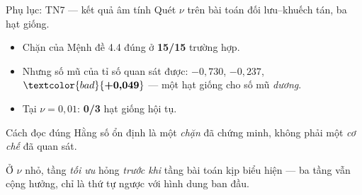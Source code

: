 \documentclass[aspectratio=169,11pt]{beamer}
\newcommand{\good}[1]{\textcolor{good}{\textbf{#1}}}
\newcommand{\bad}[1]{\textcolor{bad}{\textbf{#1}}}
\begin{document}
\begin{frame}{Phụ lục: TN7 --- kết quả âm tính}
Quét $\nu$ trên bài toán đối lưu--khuếch tán, ba hạt giống.

\begin{itemize}
\item Chặn của Mệnh đề 4.4 đúng ở \good{15/15} trường hợp.
\item Nhưng số mũ của tỉ số quan sát được: $-0{,}730$, $-0{,}237$, $\bad{+0{,}049}$
  --- một hạt giống cho số mũ \emph{dương}.
\item Tại $\nu = 0{,}01$: \bad{0/3} hạt giống hội tụ.
\end{itemize}

\medskip
\begin{alertblock}{Cách đọc đúng}
Hằng số ổn định là một \emph{chặn} đã chứng minh,
\alert{không phải một \emph{cơ chế} đã quan sát}.

\smallskip
\footnotesize Ở $\nu$ nhỏ, tầng \emph{tối ưu} hỏng \emph{trước khi} tầng bài toán
kịp biểu hiện --- ba tầng vẫn cộng hưởng, chỉ là thứ tự ngược với hình dung ban đầu.
\end{alertblock}
\end{frame}
\end{document}
